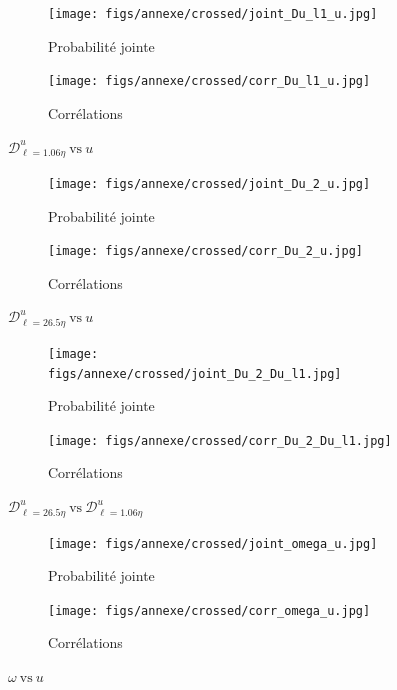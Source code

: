\documentclass[13pt, a4paper]{extarticle}
\begin{document}
\begin{figure}[H]
  \centering
  \begin{subfigure}[b]{0.48\linewidth}
  \centering
  \texttt{[image: figs/annexe/crossed/joint\_Du\_l1\_u.jpg]}
  \caption{Probabilité jointe}
  \end{subfigure}
  \begin{subfigure}[b]{0.48\linewidth}
    \centering
    \texttt{[image: figs/annexe/crossed/corr\_Du\_l1\_u.jpg]}
    \caption{Corrélations}
    \end{subfigure}
    \caption{$\mathscr{D}^u_{\ell=1.06\eta}~\text{vs}~u$}
\end{figure}

\begin{figure}[H]
  \centering
  \begin{subfigure}[b]{0.48\linewidth}
  \centering
  \texttt{[image: figs/annexe/crossed/joint\_Du\_2\_u.jpg]}
  \caption{Probabilité jointe}
  \end{subfigure}
  \begin{subfigure}[b]{0.48\linewidth}
    \centering
    \texttt{[image: figs/annexe/crossed/corr\_Du\_2\_u.jpg]}
    \caption{Corrélations}
    \end{subfigure}
    \caption{$\mathscr{D}^u_{\ell=26.5\eta}~\text{vs}~u$}
\end{figure}

\begin{figure}[H]
  \centering
  \begin{subfigure}[b]{0.48\linewidth}
  \centering
  \texttt{[image: figs/annexe/crossed/joint\_Du\_2\_Du\_l1.jpg]}
  \caption{Probabilité jointe}
  \end{subfigure}
  \begin{subfigure}[b]{0.48\linewidth}
    \centering
    \texttt{[image: figs/annexe/crossed/corr\_Du\_2\_Du\_l1.jpg]}
    \caption{Corrélations}
    \end{subfigure}
    \caption{$\mathscr{D}^u_{\ell=26.5\eta}~\text{vs}~\mathscr{D}^u_{\ell=1.06\eta}$}
\end{figure}

\begin{figure}[H]
  \centering
  \begin{subfigure}[b]{0.48\linewidth}
  \centering
  \texttt{[image: figs/annexe/crossed/joint\_omega\_u.jpg]}
  \caption{Probabilité jointe}
  \end{subfigure}
  \begin{subfigure}[b]{0.48\linewidth}
    \centering
    \texttt{[image: figs/annexe/crossed/corr\_omega\_u.jpg]}
    \caption{Corrélations}
    \end{subfigure}
    \caption{$\omega~\text{vs}~u$}
\end{figure}
\end{document}
